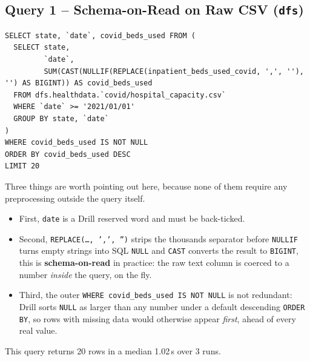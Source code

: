 \documentclass[11pt,a4paper]{article}
\begin{document}
\subsection{Query 1 -- Schema-on-Read on Raw CSV (\texttt{dfs})}
\begin{lstlisting}[style=sqlstyle]
SELECT state, `date`, covid_beds_used FROM (
  SELECT state,
         `date`,
         SUM(CAST(NULLIF(REPLACE(inpatient_beds_used_covid, ',', ''), '') AS BIGINT)) AS covid_beds_used
  FROM dfs.healthdata.`covid/hospital_capacity.csv`
  WHERE `date` >= '2021/01/01'
  GROUP BY state, `date`
)
WHERE covid_beds_used IS NOT NULL
ORDER BY covid_beds_used DESC
LIMIT 20
\end{lstlisting}
Three things are worth pointing out here, because none of them require any
preprocessing outside the query itself. \begin{itemize}
    \item First, \texttt{date} is a Drill reserved
word and must be back-ticked.
\item  Second, \texttt{REPLACE(\ldots, ',', '')} strips the
thousands separator before \texttt{NULLIF} turns empty strings into SQL \texttt{NULL}
and \texttt{CAST} converts the result to \texttt{BIGINT}, this is \textbf{schema-on-read }in
practice: the raw text column is coerced to a number \emph{inside} the query, on the
fly.
\item Third, the outer \texttt{WHERE covid\_beds\_used IS NOT NULL} is not redundant:
Drill sorts \texttt{NULL} as larger than any number under a default descending
\texttt{ORDER BY}, so rows with missing data would otherwise appear \emph{first},
ahead of every real value.
\end{itemize}  This query returns 20 rows in a median 1.02\,s over 3 runs.
\end{document}
